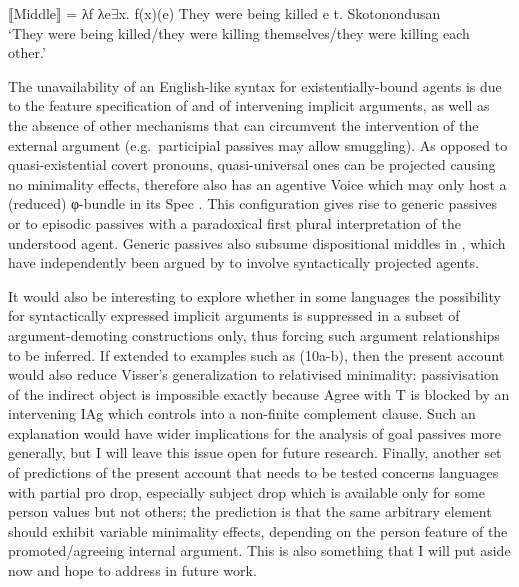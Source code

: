 \documentclass[output=paper]{langsci/langscibook}
\begin{document}
\begin{exe}
    ⟦Middle⟧ = λf λe${\exists}$x. f(x)(e)\label{ex:22.6prime}
\ex%
    \label{ex:22.49}
    \ea They were being killed e t.
    \ex Skotonondusan\\
        \enquote*{They were being killed\slash they were killing themselves\slash they
        were killing each other.}
    \z
\z

The unavailability of an English-like syntax for existentially-bound agents is
due to the feature specification of  and of intervening implicit
arguments, as well as the absence of other mechanisms that can circumvent the
intervention of the external argument (e.g.\ participial passives
may allow  smuggling). As opposed to quasi-existential
covert pronouns, quasi-universal ones can be projected causing no minimality
effects, therefore  also has an agentive  Voice which
may only host a (reduced) φ-bundle in its Spec \citep{Legate2014}. This
configuration gives rise to generic passives or to episodic
passives with a paradoxical first plural interpretation of the
understood agent. Generic passives also subsume dispositional middles in
, which have independently been argued by \citet{Lekakou2005} to
involve syntactically projected agents.

It would also be interesting to explore whether in some languages the
possibility for syntactically expressed implicit arguments is suppressed in a
subset of argument-demoting constructions only, thus forcing such argument
relationships to be inferred. If extended to examples such as (10a-b), then the
present account would also reduce Visser’s generalization to relativised
minimality: passivisation of the indirect object is impossible exactly because
Agree with T is blocked by an intervening \gls{IAg} which controls into a non-finite
complement clause. Such an explanation would have wider implications for the
analysis of goal passives more generally, but I will leave this issue open for
future research. Finally, another set of predictions of the present account
that needs to be tested concerns languages with partial pro drop, especially
subject drop which is available only for some person values but not others; the
prediction is that the same arbitrary element should exhibit variable
minimality effects, depending on the person feature of the promoted/agreeing
internal argument. This is also something that I will put aside now and hope to
address in future work.


\end{exe}
\end{document}
